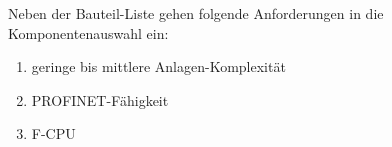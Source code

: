  Neben der Bauteil-Liste gehen folgende Anforderungen in die Komponentenauswahl ein:

 \begin{enumerate}
    \itemsep0.1em
     \item geringe bis mittlere Anlagen-Komplexität
     \item PROFINET-Fähigkeit
     \item F-CPU
 \end{enumerate}





